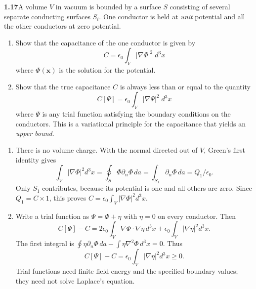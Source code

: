 \par\bigskip
\noindent\textbf{1.17}\quad A volume $V$ in vacuum is bounded by a surface $S$ consisting of several separate conducting surfaces $S_{i}$. One conductor is held at \emph{unit} potential and all the other conductors at zero potential.
\begin{enumerate}
\item[(a)] Show that the capacitance of the one conductor is given by
\[
C = \epsilon_{0}\int_{V}|\nabla\Phi|^{2}\;d^{3}x
\]
where $\Phi(\mathbf{x})$ is the solution for the potential.
\item[(b)] Show that the true capacitance $C$ is always less than or equal to the quantity
\[
C[\Psi] = \epsilon_{0}\int_{V}|\nabla\Psi|^{2}\;d^{3}x
\]
where $\Psi$ is any trial function satisfying the boundary conditions on the conductors. This is a variational principle for the capacitance that yields an \emph{upper bound}.
\end{enumerate}
\solution
\begin{enumerate}
\item[(a)] There is no volume charge. With the normal directed out of $V$,
Green's first identity gives
\[
\int_V|\nabla\Phi|^2d^3x
=\oint_S\Phi\partial_n\Phi\,da
=\int_{S_1}\partial_n\Phi\,da=Q_1/\epsilon_0.
\]
Only $S_1$ contributes, because its potential is one and all others are zero.
Since $Q_1=C\times1$, this proves
$\boxed{C=\epsilon_0\int_V|\nabla\Phi|^2d^3x}$.
\item[(b)] Write a trial function as $\Psi=\Phi+\eta$ with $\eta=0$ on every
conductor. Then
\[
C[\Psi]-C
=2\epsilon_0\int_V\nabla\Phi\cdot\nabla\eta\,d^3x
+\epsilon_0\int_V|\nabla\eta|^2d^3x.
\]
The first integral is
$\oint\eta\partial_n\Phi\,da-\int\eta\nabla^2\Phi\,d^3x=0$.
Thus
\[
\boxed{C[\Psi]-C=\epsilon_0\int_V|\nabla\eta|^2d^3x\ge0.}
\]
Trial functions need finite field energy and the specified boundary values;
they need not solve Laplace's equation.
\end{enumerate}


